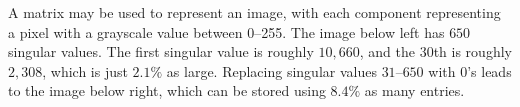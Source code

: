\documentclass[11pt,oneside]{amsbook}
\theoremstyle{definition}
\theoremstyle{plain}
\theoremstyle{definition}
\theoremstyle{remark}
\newtheorem{example}[theorem]{Example}
\numberwithin{equation}{section}
\numberwithin{figure}{section}
\begin{document}
A matrix may be used to represent an image, with each component representing a pixel with a grayscale value between 0--255. The image below left has $650$ singular values. The first singular value is roughly $10,660$, and the $30$th is roughly $2,308$, which is just $2.1\%$ as large. Replacing singular values $31$--$650$ with $0$'s leads to the image below right, which can be stored using $8.4\%$ as many entries.

\begin{figure}[h]
\end{figure}

%   
\end{document}
